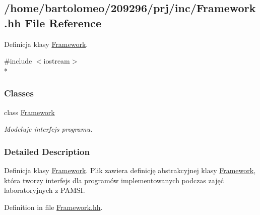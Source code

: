 \hypertarget{_framework_8hh}{\subsection{/home/bartolomeo/209296/prj/inc/\-Framework.hh File Reference}
\label{_framework_8hh}
}


Definicja klasy \hyperlink{class_framework}{Framework}.  


{\ttfamily \#include $<$iostream$>$}\\*
\subsubsection*{Classes}
\begin{DoxyCompactItemize}
\item 
class \hyperlink{class_framework}{Framework}
\begin{DoxyCompactList}\small\item\em Modeluje interfejs programu. \end{DoxyCompactList}\end{DoxyCompactItemize}


\subsubsection{Detailed Description}
Definicja klasy \hyperlink{class_framework}{Framework}. Plik zawiera definicję abstrakcyjnej klasy \hyperlink{class_framework}{Framework}, która tworzy interfejs dla programów implementowanych podczas zajęć laboratoryjnych z P\-A\-M\-S\-I. 

Definition in file \hyperlink{_framework_8hh_source}{Framework.\-hh}.

